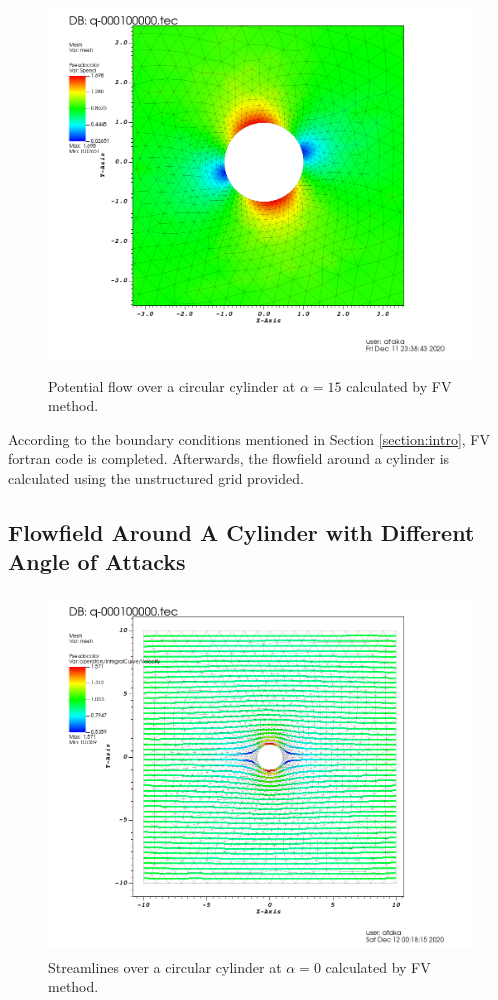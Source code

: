 \documentclass[letterpaper,12pt]{article}
\begin{document}
\begin{figure} [ht]
	\centering
	\includegraphics[height = 10cm]{graph/15deg/Cylinder_15angle_speed0001.png}
	\caption{Potential flow over a circular cylinder at $\alpha=15$ calculated by FV method.}
    \label{fig:q1p}
\end{figure}

\vspace{1cm}

According to the boundary conditions mentioned in Section \ref{section:intro}, FV fortran code
is completed. Afterwards, the flowfield around a cylinder is calculated using the unstructured grid provided.

\newpage

\subsection{Flowfield Around A Cylinder with Different Angle of Attacks}
\begin{figure} [ht]
	\centering
	\includegraphics[height = 9.5cm]{graph/0deg/Cylinder_0angle_streamline0000.png}
	\caption{Streamlines over a circular cylinder at $\alpha=0$ calculated by FV method.}
    \label{fig:q2st0}
\end{figure}
\end{document}
